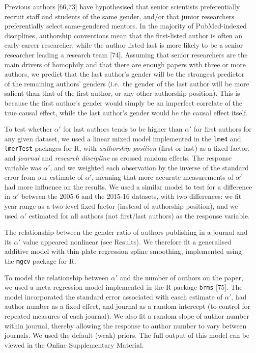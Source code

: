 \documentclass[12pt,]{article}
\begin{document}
Previous authors {[}66,73{]} have hypothesised that senior scientists
preferentially recruit staff and students of the same gender, and/or
that junior researchers preferentially select same-gendered mentors. In
the majority of PubMed-indexed disciplines, authorship conventions mean
that the first-listed author is often an early-career researcher, while
the author listed last is more likely to be a senior researcher leading
a research team {[}74{]}. Assuming that senior researchers are the main
drivers of homophily and that there are enough papers with three or more
authors, we predict that the last author's gender will be the strongest
predictor of the remaining authors' genders (i.e.~the gender of the last
author will be more salient than that of the first author, or any other
authorship position). This is because the first author's gender would
simply be an imperfect correlate of the true causal effect, while the
last author's gender would be the causal effect itself.

To test whether \(\alpha'\) for last authors tends to be higher than
\(\alpha'\) for first authors for any given dataset, we used a linear
mixed model implemented in the \texttt{lme4} and \texttt{lmerTest}
packages for R, with \emph{authorship position} (first or last) as a
fixed factor, and \emph{journal} and \emph{research discipline} as
crossed random effects. The response variable was \(\alpha'\), and we
weighted each observation by the inverse of the standard error from our
estimate of \(\alpha'\), meaning that more accurate measurements of
\(\alpha'\) had more influence on the results. We used a similar model
to test for a difference in \(\alpha'\) between the 2005-6 and the
2015-16 datasets, with two differences: we fit year range as a two-level
fixed factor (instead of authorship position), and we used \(\alpha'\)
estimated for all authors (not first/last authors) as the response
variable.

The relationship between the gender ratio of authors publishing in a
journal and its \(\alpha'\) value appeared nonlinear (see Results). We
therefore fit a generalised additive model with thin plate regression
spline smoothing, implemented using the \texttt{mgcv} package for R.

To model the relationship between \(\alpha'\) and the number of authors
on the paper, we used a meta-regression model implemented in the R
package \texttt{brms} {[}75{]}. The model incorporated the standard
error associated with easch estimate of \(\alpha'\), had author number
as a fixed effect, and journal as a random intercept (to control for
repeated measures of each journal). We also fit a random slope of author
number within journal, thereby allowing the response to author number to
vary between journals. We used the default (weak) priors. The full
output of this model can be viewed in the Online Supplementary Material.
\end{document}
